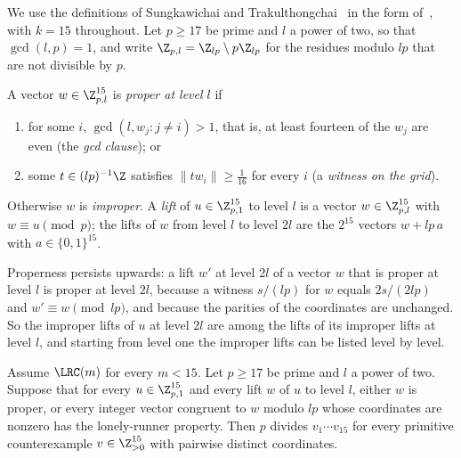 We use the definitions of Sungkawichai and Trakulthongchai~\cite{ST26} in the
form of~\cite[Sect.~2]{All26}, with $k=15$ throughout. Let $p\ge17$ be prime
and $l$ a power of two, so that $\gcd(l,p)=1$, and write
$\Z_{p,l}=\Z_{lp}\setminus p\Z_{lp}$ for the residues modulo $lp$ that are not
divisible by $p$.

\begin{definition}\label{def:proper}
A vector $w\in\Z_{p,l}^{15}$ is \emph{proper at level $l$} if
\begin{enumerate}[label=(\alph*),leftmargin=2em]
\item for some $i$, $\gcd(l,w_j:j\ne i)>1$, that is, at least fourteen of
the $w_j$ are even (the \emph{gcd clause}); or
\item some $t\in(lp)^{-1}\Z$ satisfies $\|tw_i\|\ge\frac1{16}$ for every $i$
(a \emph{witness on the grid}).
\end{enumerate}
Otherwise $w$ is \emph{improper}. A \emph{lift} of $u\in\Z_{p,1}^{15}$ to
level $l$ is a vector $w\in\Z_{p,l}^{15}$ with $w\equiv u\pmod p$; the lifts of
$w$ from level $l$ to level $2l$ are the $2^{15}$ vectors $w+lp\,a$ with
$a\in\{0,1\}^{15}$.
\end{definition}

Properness persists upwards: a lift $w'$ at level $2l$ of a vector $w$ that
is proper at level $l$ is proper at level $2l$, because a witness $s/(lp)$
for $w$ equals $2s/(2lp)$ and $w'\equiv w\pmod{lp}$, and because the
parities of the coordinates are unchanged. So the improper lifts of $u$ at
level $2l$ are among the lifts of its improper lifts at level $l$, and
starting from level one the improper lifts can be listed level by level.

\begin{lemma}\label{lem:criterion}
Assume $\LRC(m)$ for every $m<15$. Let $p\ge17$ be prime and $l$ a power of
two. Suppose that for every $u\in\Z_{p,1}^{15}$ and every lift $w$ of $u$ to
level $l$, either $w$ is proper, or every integer vector congruent to $w$
modulo $lp$ whose coordinates are nonzero has the lonely-runner property.
Then $p$ divides $v_1\cdots v_{15}$ for every primitive counterexample
$v\in\Z_{>0}^{15}$ with pairwise distinct coordinates.
\end{lemma}


